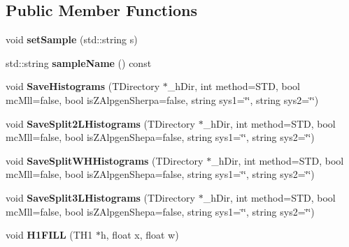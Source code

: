 \subsection*{Public Member Functions}
\begin{DoxyCompactItemize}
\item 
\hypertarget{classSusyHistos_a7b988b4c8828c0dbfe376d908757a862}{
void {\bfseries setSample} (std::string s)}
\label{classSusyHistos_a7b988b4c8828c0dbfe376d908757a862}

\item 
\hypertarget{classSusyHistos_a28f9d44ef663c1efc1d976366de39c81}{
std::string {\bfseries sampleName} () const }
\label{classSusyHistos_a28f9d44ef663c1efc1d976366de39c81}

\item 
\hypertarget{classSusyHistos_a091d793996ecc86011fd875223f192ef}{
void {\bfseries SaveHistograms} (TDirectory $\ast$\_\-hDir, int method=STD, bool mcMll=false, bool isZAlpgenSherpa=false, string sys1=\char`\"{}\char`\"{}, string sys2=\char`\"{}\char`\"{})}
\label{classSusyHistos_a091d793996ecc86011fd875223f192ef}

\item 
\hypertarget{classSusyHistos_a14092bd49d755f07b3fb03d9a4e47149}{
void {\bfseries SaveSplit2LHistograms} (TDirectory $\ast$\_\-hDir, int method=STD, bool mcMll=false, bool isZAlpgenShepa=false, string sys1=\char`\"{}\char`\"{}, string sys2=\char`\"{}\char`\"{})}
\label{classSusyHistos_a14092bd49d755f07b3fb03d9a4e47149}

\item 
\hypertarget{classSusyHistos_a4e5a682cb040a60c91b92d3cf2a51c02}{
void {\bfseries SaveSplitWHHistograms} (TDirectory $\ast$\_\-hDir, int method=STD, bool mcMll=false, bool isZAlpgenShepa=false, string sys1=\char`\"{}\char`\"{}, string sys2=\char`\"{}\char`\"{})}
\label{classSusyHistos_a4e5a682cb040a60c91b92d3cf2a51c02}

\item 
\hypertarget{classSusyHistos_a597756bb5a013d3ca51a0fecb9a9744d}{
void {\bfseries SaveSplit3LHistograms} (TDirectory $\ast$\_\-hDir, int method=STD, bool mcMll=false, bool isZAlpgenShepa=false, string sys1=\char`\"{}\char`\"{}, string sys2=\char`\"{}\char`\"{})}
\label{classSusyHistos_a597756bb5a013d3ca51a0fecb9a9744d}

\item 
\hypertarget{classSusyHistos_a99c39fa0439e5be3b608de6b747366ef}{
void {\bfseries H1FILL} (TH1 $\ast$h, float x, float w)}
\label{classSusyHistos_a99c39fa0439e5be3b608de6b747366ef}


\end{DoxyCompactItemize}
